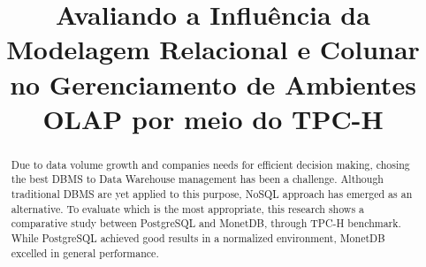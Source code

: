 \documentclass[12pt]{article}
\begin{document}
 

\title{Avaliando a Influência da Modelagem Relacional e Colunar no Gerenciamento de Ambientes OLAP por meio do TPC-H}
\author{}
\address{}

\maketitle

\begin{abstract}

Due to data volume growth and companies needs for efficient decision making, 
chosing the best DBMS to Data Warehouse management has been a challenge. Although 
traditional DBMS are yet applied to this purpose, NoSQL approach has emerged 
as an alternative. To evaluate which is the most appropriate, this research 
shows a comparative study between PostgreSQL and MonetDB, through TPC-H benchmark. 
While PostgreSQL achieved good results in a normalized environment, 
MonetDB excelled in general performance.


\end{abstract}
     
\end{document}
